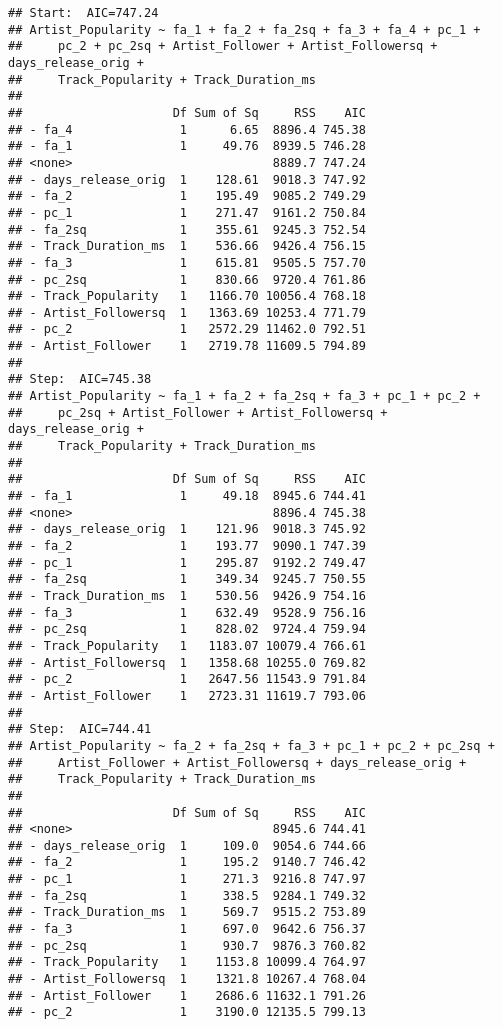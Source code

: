 \documentclass[
]{article}
\begin{document}
\begin{verbatim}
## Start:  AIC=747.24
## Artist_Popularity ~ fa_1 + fa_2 + fa_2sq + fa_3 + fa_4 + pc_1 + 
##     pc_2 + pc_2sq + Artist_Follower + Artist_Followersq + days_release_orig + 
##     Track_Popularity + Track_Duration_ms
## 
##                     Df Sum of Sq     RSS    AIC
## - fa_4               1      6.65  8896.4 745.38
## - fa_1               1     49.76  8939.5 746.28
## <none>                            8889.7 747.24
## - days_release_orig  1    128.61  9018.3 747.92
## - fa_2               1    195.49  9085.2 749.29
## - pc_1               1    271.47  9161.2 750.84
## - fa_2sq             1    355.61  9245.3 752.54
## - Track_Duration_ms  1    536.66  9426.4 756.15
## - fa_3               1    615.81  9505.5 757.70
## - pc_2sq             1    830.66  9720.4 761.86
## - Track_Popularity   1   1166.70 10056.4 768.18
## - Artist_Followersq  1   1363.69 10253.4 771.79
## - pc_2               1   2572.29 11462.0 792.51
## - Artist_Follower    1   2719.78 11609.5 794.89
## 
## Step:  AIC=745.38
## Artist_Popularity ~ fa_1 + fa_2 + fa_2sq + fa_3 + pc_1 + pc_2 + 
##     pc_2sq + Artist_Follower + Artist_Followersq + days_release_orig + 
##     Track_Popularity + Track_Duration_ms
## 
##                     Df Sum of Sq     RSS    AIC
## - fa_1               1     49.18  8945.6 744.41
## <none>                            8896.4 745.38
## - days_release_orig  1    121.96  9018.3 745.92
## - fa_2               1    193.77  9090.1 747.39
## - pc_1               1    295.87  9192.2 749.47
## - fa_2sq             1    349.34  9245.7 750.55
## - Track_Duration_ms  1    530.56  9426.9 754.16
## - fa_3               1    632.49  9528.9 756.16
## - pc_2sq             1    828.02  9724.4 759.94
## - Track_Popularity   1   1183.07 10079.4 766.61
## - Artist_Followersq  1   1358.68 10255.0 769.82
## - pc_2               1   2647.56 11543.9 791.84
## - Artist_Follower    1   2723.31 11619.7 793.06
## 
## Step:  AIC=744.41
## Artist_Popularity ~ fa_2 + fa_2sq + fa_3 + pc_1 + pc_2 + pc_2sq + 
##     Artist_Follower + Artist_Followersq + days_release_orig + 
##     Track_Popularity + Track_Duration_ms
## 
##                     Df Sum of Sq     RSS    AIC
## <none>                            8945.6 744.41
## - days_release_orig  1     109.0  9054.6 744.66
## - fa_2               1     195.2  9140.7 746.42
## - pc_1               1     271.3  9216.8 747.97
## - fa_2sq             1     338.5  9284.1 749.32
## - Track_Duration_ms  1     569.7  9515.2 753.89
## - fa_3               1     697.0  9642.6 756.37
## - pc_2sq             1     930.7  9876.3 760.82
## - Track_Popularity   1    1153.8 10099.4 764.97
## - Artist_Followersq  1    1321.8 10267.4 768.04
## - Artist_Follower    1    2686.6 11632.1 791.26
## - pc_2               1    3190.0 12135.5 799.13
\end{verbatim}
\end{document}
